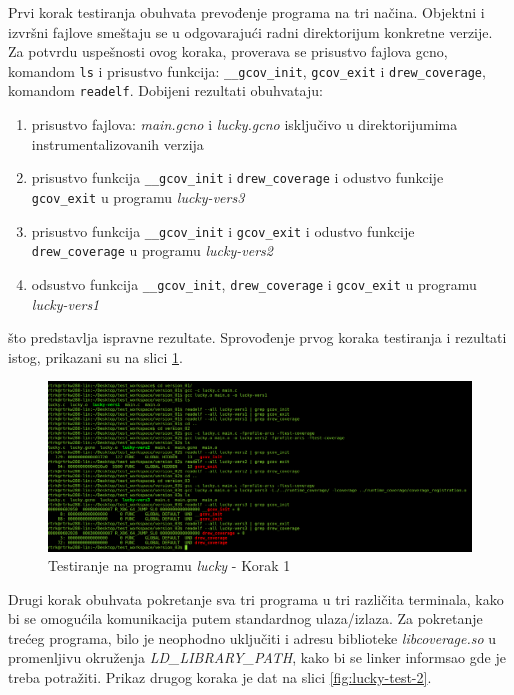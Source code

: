 \documentclass[12pt,oneside]{memoir}
\newcommand{\kod}[1]{\texttt{#1}}
\newcommand{\strano}[1]{\textit{#1}}
\begin{document}
Prvi korak testiranja obuhvata prevođenje programa na tri načina. Objektni i izvršni fajlove smeštaju se u odgovarajući radni direktorijum konkretne verzije. Za potvrdu uspešnosti ovog koraka, proverava se prisustvo fajlova gcno, komandom \kod{ls} i prisustvo funkcija: \kod{\_\_gcov\_init}, \kod{gcov\_exit} i \kod{drew\_coverage}, komandom \kod{readelf}. Dobijeni rezultati obuhvataju:
\begin{enumerate}
\item prisustvo fajlova: \strano{main.gcno} i \strano{lucky.gcno} isključivo u direktorijumima instrumentalizovanih verzija
\item prisustvo funkcija \kod{\_\_gcov\_init} i \kod{drew\_coverage} i odustvo funkcije \kod{gcov\_exit} u programu \strano{lucky-vers3}
\item prisustvo funkcija \kod{\_\_gcov\_init} i \kod{gcov\_exit} i odustvo funkcije \kod{drew\_coverage} u programu \strano{lucky-vers2}
\item odsustvo funkcija \kod{\_\_gcov\_init}, \kod{drew\_coverage} i \kod{gcov\_exit} u programu \strano{lucky-vers1}
\end{enumerate}

što predstavlja ispravne rezultate. Sprovođenje prvog koraka testiranja i rezultati istog, prikazani su na slici \ref{fig:lucky-test-1}.

\begin{figure}[!ht]
  \centering
  \includegraphics[width=\textwidth]{img/lucky1.png}
  \caption{Testiranje na programu \strano{lucky} - Korak 1}
  \label{fig:lucky-test-1}
\end{figure}

Drugi korak obuhvata pokretanje sva tri programa u tri različita terminala, kako bi se omogućila komunikacija putem standardnog ulaza/izlaza. Za pokretanje trećeg programa, bilo je neophodno uključiti i adresu biblioteke \strano{libcoverage.so} u promenljivu okruženja \strano{LD\_LIBRARY\_PATH}, kako bi se linker informsao gde je treba potražiti. Prikaz drugog koraka je dat na slici \ref{fig:lucky-test-2}. 
\end{document}
